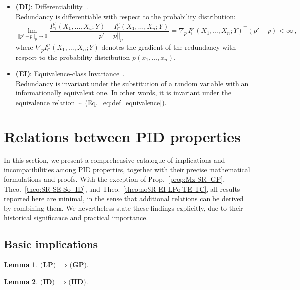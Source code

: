\documentclass{article}
\newcommand{\XsY}{X_1,\ldots,X_n;Y}
\newcommand{\GP}{\textbf{(GP)}\xspace} %
\newcommand{\ID}{\textbf{(ID)}\xspace} %
\newcommand{\IID}{\textbf{(IID)}\xspace} %
\newcommand{\LP}{\textbf{(LP)}\xspace}
\newtheorem{lemma}{Lemma}
\begin{document}
\begin{itemize}
    \item \textbf{(DI)}: Differentiability~\cite{makkeh2021introducing}. \\
    Redundancy is differentiable with respect to the probability distribution:
    \begin{equation}\label{ax:DI}
        \lim_{||p' - p||_p \to 0} 
        \frac{I^{p'}_\cap(\XsY) - I^p_\cap(\XsY)}
        {||p' - p||_p} = \nabla_p \,I^p_\cap(\XsY)^\top (p' - p) < \infty \,,
    \end{equation}
    where $\nabla_p I^p_\cap(\XsY)$ denotes the gradient of the redundancy with respect to the probability distribution $p(x_1,\ldots,x_n)$.

    \item \textbf{(EI)}: Equivalence-class Invariance~\cite{griffith2014intersection}. \\
    Redundancy is invariant under the substitution of a random variable with an informationally equivalent one. In other words, it is invariant under the equivalence relation $\sim$ (Eq.~\eqref{eq:def_equivalence}).
\end{itemize}


\section{Relations between PID properties}

In this section, we present a comprehensive catalogue of implications and incompatibilities among PID properties, together with their precise mathematical formulations and proofs. With the exception of Prop.~\ref{prop:Mz-SR--GP}, Theo.~\ref{theo:SR-SE-So--ID}, and Theo.~\ref{theo:noSR-EI-LPo-TE-TC}, all results reported here are minimal, in the sense that additional relations can be derived by combining them. We nevertheless state these findings explicitly, due to their historical significance and practical importance.
    
\subsection{Basic implications}

\begin{lemma} \label{lemma:LP--GP}
    $\LP \implies \GP.$
\end{lemma}

\begin{lemma} \label{lemma:ID--IID}
    $\ID \implies \IID.$
\end{lemma}
\end{document}
